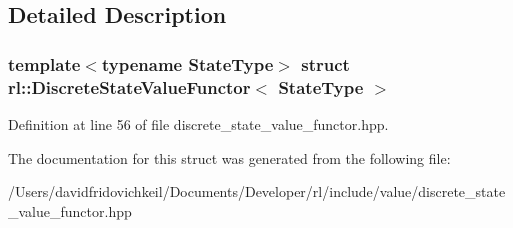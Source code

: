 \subsection{Detailed Description}
\subsubsection*{template$<$typename State\+Type$>$\newline
struct rl\+::\+Discrete\+State\+Value\+Functor$<$ State\+Type $>$}



Definition at line 56 of file discrete\+\_\+state\+\_\+value\+\_\+functor.\+hpp.



The documentation for this struct was generated from the following file\+:\begin{DoxyCompactItemize}
\item 
/\+Users/davidfridovichkeil/\+Documents/\+Developer/rl/include/value/discrete\+\_\+state\+\_\+value\+\_\+functor.\+hpp\end{DoxyCompactItemize}
